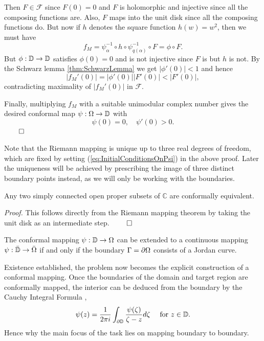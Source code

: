 Then $F\in\mathcal{F}$ since $F(0) = 0$ and $F$ is holomorphic and injective since all the composing functions are. Also, $F$ maps into the unit disk since all the composing functions do.
But now if $h$ denotes the square function $h(w)=w^2$, then we must have $$f_{M} = \psi_{\alpha}^{-1}\circ h \circ \psi_{q(\alpha)}^{-1} \circ F = \phi \circ F.$$
But $\phi:\mathbb{D}\to\mathbb{D}$ satisfies $\phi(0) = 0$ and is not injective since $F$ is but $h$ is not. 
By the Schwarz lemma \ref{thm:SchwarzLemma} we get $|\phi'(0)| < 1$ and hence
$$|f_{M}'(0)| = |\phi'(0)||F'(0)| < |F'(0)|,$$
contradicting maximality of $|f_{M}'(0)|$ in $\mathcal{F}$.

Finally, multiplying $f_{M}$ with a suitable unimodular complex number gives the desired conformal map $\psi:\Omega \to \mathbb{D}$ with
\begin{equation}\label{eq:InitialConditionsOnPsi}
    \psi(0)=0 , \quad \psi'(0)>0.
\end{equation}
$\hfill\qed$

Note that the Riemann mapping is unique up to three real degrees of freedom, which are fixed by setting (\ref{eq:InitialConditionsOnPsi}) in the above proof. Later the uniqueness will be achieved by prescribing the image of three distinct boundary points instead, as we will only be working with the boundaries.
\begin{corollary}
    Any two simply connected open proper subsets of $\mathbb{C}$ are conformally equivalent.
\end{corollary}
\textit{Proof.} This follows directly from the Riemann mapping theorem by taking the unit disk as an intermediate step.
$\hfill\qed$

\begin{theorem} \label{thm:ExtensionToBoundary}
    The conformal mapping $\psi:\mathbb{D}\to \Omega$ can be extended to a continuous mapping $\psi:\bar{\mathbb{D}}\to\bar{\Omega}$ if and only if the boundary $\Gamma=\partial\Omega$ consists of a Jordan curve.
\end{theorem}
\bigskip

Existence established, the problem now becomes the explicit construction of a conformal mapping.
Once the boundaries of the domain and target region are conformally mapped, the interior can be deduced from the boundary by the Cauchy Integral Formula \cite[page 357]{Wegmann2005_num_methods_confmapping}, \cite[Theorem 1.2]{Gaier1964}
\begin{equation} \label{eq:CauchyIntegralFormula}
    \psi(z)=\frac{1}{2\pi i}\int_{\partial\mathbb{D}} \frac{\psi(\zeta)}{\zeta - z} d\zeta \quad \text{ for } z\in\mathbb{D}.
\end{equation}
Hence why the main focus of the task lies on mapping boundary to boundary.

